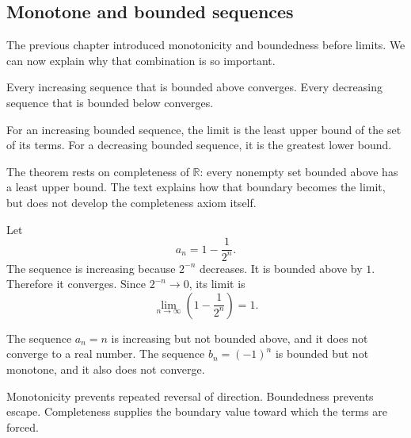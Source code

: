 \subsection{Monotone and bounded sequences}

The previous chapter introduced monotonicity and boundedness before limits. We can now explain why that combination is so important.

\begin{theorembox}
Every increasing sequence that is bounded above converges. Every decreasing sequence that is bounded below converges.
\end{theorembox}

For an increasing bounded sequence, the limit is the least upper bound of the set of its terms. For a decreasing bounded sequence, it is the greatest lower bound.

\begin{remarkbox}
The theorem rests on completeness of $\mathbb R$: every nonempty set bounded above has a least upper bound. The text explains how that boundary becomes the limit, but does not develop the completeness axiom itself.
\end{remarkbox}

\begin{examplebox}
Let
\[
a_n=1-\frac1{2^n}.
\]
The sequence is increasing because $2^{-n}$ decreases. It is bounded above by $1$. Therefore it converges. Since $2^{-n}\to0$, its limit is
\[
\lim_{n\to\infty}\left(1-\frac1{2^n}\right)=1.
\]
\end{examplebox}

\begin{examplebox}
The sequence $a_n=n$ is increasing but not bounded above, and it does not converge to a real number. The sequence $b_n=(-1)^n$ is bounded but not monotone, and it also does not converge.
\end{examplebox}

\begin{interpretationbox}
Monotonicity prevents repeated reversal of direction. Boundedness prevents escape. Completeness supplies the boundary value toward which the terms are forced.
\end{interpretationbox}
